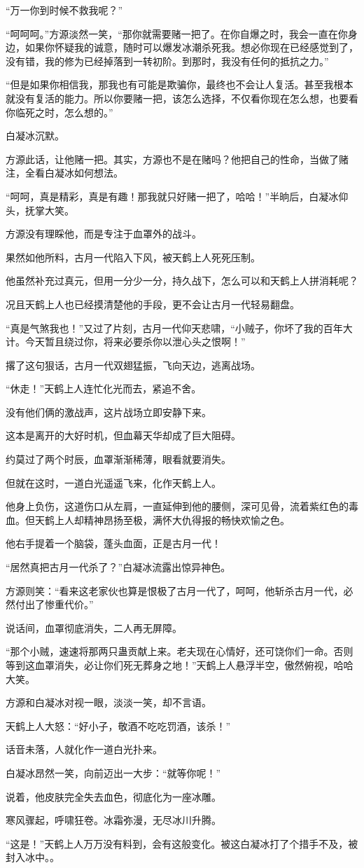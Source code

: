 \begin{this_body}
“万一你到时候不救我呢？”

“呵呵呵。”方源淡然一笑，“那你就需要赌一把了。在你自爆之时，我会一直在你身边，如果你怀疑我的诚意，随时可以爆发冰潮杀死我。想必你现在已经感觉到了，没有错，我的修为已经掉落到一转初阶。到那时，我没有任何的抵抗之力。”

“但是如果你相信我，那我也有可能是欺骗你，最终也不会让人复活。甚至我根本就没有复活的能力。所以你要赌一把，该怎么选择，不仅看你现在怎么想，也要看你临死之时，怎么想的。”

白凝冰沉默。

方源此话，让他赌一把。其实，方源也不是在赌吗？他把自己的性命，当做了赌注，全看白凝冰如何想法。

“呵呵，真是精彩，真是有趣！那我就只好赌一把了，哈哈！”半晌后，白凝冰仰头，抚掌大笑。

方源没有理睬他，而是专注于血罩外的战斗。

果然如他所料，古月一代陷入下风，被天鹤上人死死压制。

他虽然补充过真元，但用一分少一分，持久战下，怎么可以和天鹤上人拼消耗呢？

况且天鹤上人也已经摸清楚他的手段，更不会让古月一代轻易翻盘。

“真是气煞我也！”又过了片刻，古月一代仰天悲啸，“小贼子，你坏了我的百年大计。今天暂且绕过你，将来必要杀你以泄心头之恨啊！”

撂了这句狠话，古月一代双翅猛振，飞向天边，逃离战场。

“休走！”天鹤上人连忙化光而去，紧追不舍。

没有他们俩的激战声，这片战场立即安静下来。

这本是离开的大好时机，但血幕天华却成了巨大阻碍。

约莫过了两个时辰，血罩渐渐稀薄，眼看就要消失。

但就在这时，一道白光遥遥飞来，化作天鹤上人。

他身上负伤，这道伤口从左肩，一直延伸到他的腰侧，深可见骨，流着紫红色的毒血。但天鹤上人却精神昂扬至极，满怀大仇得报的畅快欢愉之色。

他右手提着一个脑袋，蓬头血面，正是古月一代！

“居然真把古月一代杀了？”白凝冰流露出惊异神色。

方源则笑：“看来这老家伙也算是恨极了古月一代了，呵呵，他斩杀古月一代，必然付出了惨重代价。”

说话间，血罩彻底消失，二人再无屏障。

“那个小贼，速速将那两只蛊贡献上来。老夫现在心情好，还可饶你们一命。否则等到这血罩消失，必让你们死无葬身之地！”天鹤上人悬浮半空，傲然俯视，哈哈大笑。

方源和白凝冰对视一眼，淡淡一笑，却不言语。

天鹤上人大怒：“好小子，敬酒不吃吃罚酒，该杀！”

话音未落，人就化作一道白光扑来。

白凝冰昂然一笑，向前迈出一大步：“就等你呢！”

说着，他皮肤完全失去血色，彻底化为一座冰雕。

寒风骤起，呼啸狂卷。冰霜弥漫，无尽冰川升腾。

“这是！”天鹤上人万万没有料到，会有这般变化。被这白凝冰打了个措手不及，被封入冰中。。

\end{this_body}

